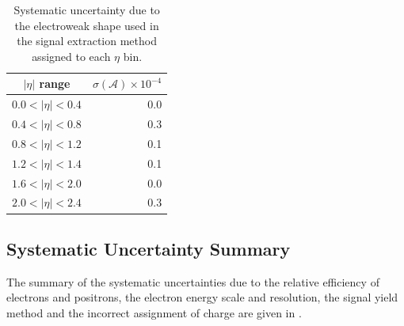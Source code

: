 \begin{table}[htbp]
\begin{center}
\begin{tabular}{cr}
    \toprule
$|\eta|$ range & $\sigma(\mathcal{A}) \times 10^{-4}$\\
\midrule
$0.0<|\eta|<0.4$ & 0.0\\
$0.4<|\eta|<0.8$ & 0.3\\
$0.8<|\eta|<1.2$ & 0.1\\
$1.2<|\eta|<1.4$ & 0.1\\
$1.6<|\eta|<2.0$ & 0.0\\
$2.0<|\eta|<2.4$ & 0.3\\
    \bottomrule
\end{tabular}
\caption[Systematic uncertainty due to the electroweak \ETm shape used in the
signal extraction method.] {\label{tab:systelectroweak}Systematic uncertainty
due to the electroweak \ETm shape used in the signal extraction method assigned
to each $\eta$ bin\cite{baisini2010electron}.}
\end{center}
\end{table}

\subsection{Systematic Uncertainty Summary}
The summary of the systematic uncertainties due to the relative efficiency of
electrons and positrons, the electron energy scale and resolution, the signal
yield method and the incorrect assignment of charge are given in
.


